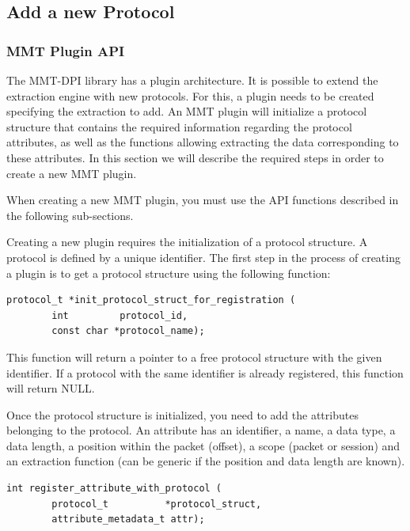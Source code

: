 \subsection{Add a new Protocol}

\subsubsection{MMT Plugin API}

The MMT-DPI library has a plugin architecture. It is possible to extend the extraction engine with new protocols. For this, a plugin needs to be created specifying the extraction to add. An MMT plugin will initialize a protocol structure that contains the required information regarding the protocol attributes, as well as the functions allowing extracting the data corresponding to these attributes. In this section we will describe the required steps in order to create a new MMT plugin.

When creating a new MMT plugin, you must use the API functions described in the following sub-sections.

Creating a new plugin requires the initialization of a protocol structure. A protocol is defined by a unique identifier. The first step in the process of creating a plugin is to get a protocol structure using the following function:

\begin{lstlisting}[style=Cpp]
protocol_t *init_protocol_struct_for_registration (
        int         protocol_id, 
        const char *protocol_name);
\end{lstlisting}

This function will return a pointer to a free protocol structure with the given identifier. If a protocol with the same identifier is already registered, this function will return NULL.

Once the protocol structure is initialized, you need to add the attributes belonging to the protocol. An attribute has an identifier, a name, a data type, a data length, a position within the packet (offset), a scope (packet or session) and an extraction function (can be generic if the position and data length are known). 

\begin{lstlisting}[style=Cpp]
int register_attribute_with_protocol (
        protocol_t          *protocol_struct, 
        attribute_metadata_t attr);
\end{lstlisting}                                                

